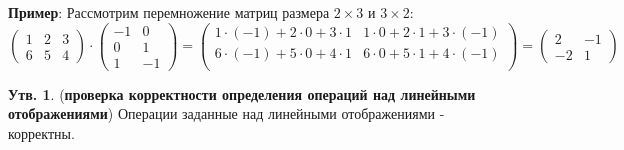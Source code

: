 \documentclass[12pt]{article}
\theoremstyle{definition}
\newtheorem{prop}{Утв.}
\begin{document}
\textbf{Пример}: Рассмотрим перемножение матриц размера $2\times 3$ и $3 \times 2$:
$$
	\begin{pmatrix}
		1 & 2 & 3\\
		6 & 5 & 4
	\end{pmatrix} {\cdot}
	\begin{pmatrix}
		-1 & 0 \\
		0 & 1 \\
		1 & -1
	\end{pmatrix} =
	\begin{pmatrix}
		1{\cdot}(-1) + 2{\cdot}0 + 3{\cdot}1 & 1{\cdot}0 + 2{\cdot}1 + 3{\cdot}(-1)\\
		6{\cdot}(-1) + 5{\cdot}0 + 4{\cdot}1 & 6{\cdot}0 + 5{\cdot}1 + 4{\cdot}(-1)\\
	\end{pmatrix} = 
	\begin{pmatrix}
		2 & -1 \\
		-2 & 1
	\end{pmatrix}
$$
\begin{prop}(\textbf{проверка корректности определения операций над линейными отображениями})
	Операции заданные над линейными отображениями - корректны.
\end{prop}
\end{document}
